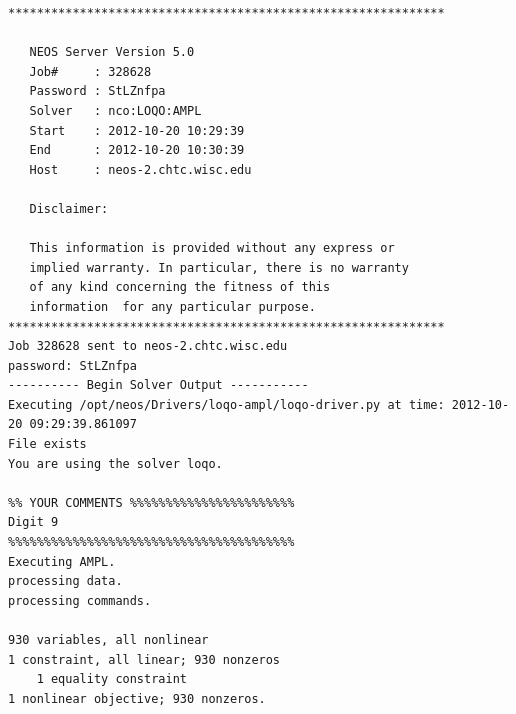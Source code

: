 \documentclass{article}
\begin{document}
\begin{verbatim}
*************************************************************

   NEOS Server Version 5.0
   Job#     : 328628
   Password : StLZnfpa
   Solver   : nco:LOQO:AMPL
   Start    : 2012-10-20 10:29:39
   End      : 2012-10-20 10:30:39
   Host     : neos-2.chtc.wisc.edu

   Disclaimer:

   This information is provided without any express or
   implied warranty. In particular, there is no warranty
   of any kind concerning the fitness of this
   information  for any particular purpose.
*************************************************************
Job 328628 sent to neos-2.chtc.wisc.edu
password: StLZnfpa
---------- Begin Solver Output -----------
Executing /opt/neos/Drivers/loqo-ampl/loqo-driver.py at time: 2012-10-20 09:29:39.861097
File exists
You are using the solver loqo.

%% YOUR COMMENTS %%%%%%%%%%%%%%%%%%%%%%%
Digit 9
%%%%%%%%%%%%%%%%%%%%%%%%%%%%%%%%%%%%%%%%
Executing AMPL.
processing data.
processing commands.

930 variables, all nonlinear
1 constraint, all linear; 930 nonzeros
	1 equality constraint
1 nonlinear objective; 930 nonzeros.


\end{verbatim}
\end{document}
